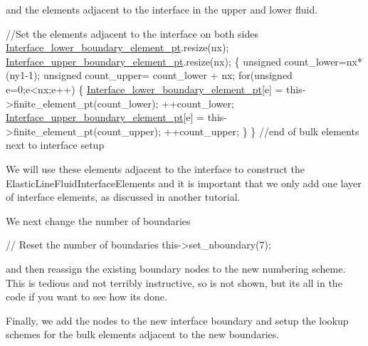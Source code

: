 and the elements adjacent to the interface in the upper and lower fluid.


\begin{DoxyCodeInclude}
   \textcolor{comment}{//Set the elements adjacent to the interface on both sides}
   \hyperlink{classElasticTwoLayerMesh_abc8751d632399afe56df6c32e1001582}{Interface\_lower\_boundary\_element\_pt}.resize(nx);
   \hyperlink{classElasticTwoLayerMesh_af8218bd023535d3dbf4af3cf7bc1c12d}{Interface\_upper\_boundary\_element\_pt}.resize(nx);
   \{
    \textcolor{keywordtype}{unsigned} count\_lower=nx*(ny1-1);
    \textcolor{keywordtype}{unsigned} count\_upper= count\_lower + nx; 
    \textcolor{keywordflow}{for}(\textcolor{keywordtype}{unsigned} e=0;e<nx;e++)
     \{
      \hyperlink{classElasticTwoLayerMesh_abc8751d632399afe56df6c32e1001582}{Interface\_lower\_boundary\_element\_pt}[e] =
     this->finite\_element\_pt(count\_lower); ++count\_lower;
      \hyperlink{classElasticTwoLayerMesh_af8218bd023535d3dbf4af3cf7bc1c12d}{Interface\_upper\_boundary\_element\_pt}[e] = 
       this->finite\_element\_pt(count\_upper); ++count\_upper;
     \}
   \} \textcolor{comment}{//end of bulk elements next to interface setup}

\end{DoxyCodeInclude}


We will use these elements adjacent to the interface to construct the {\ttfamily Elastic\+Line\+Fluid\+Interface\+Elements} and it is important that we only add one layer of interface elements, as discussed in another tutorial.

We next change the number of boundaries


\begin{DoxyCodeInclude}
   \textcolor{comment}{// Reset the number of boundaries}
   this->set\_nboundary(7);

\end{DoxyCodeInclude}


and then reassign the existing boundary nodes to the new numbering scheme. This is tedious and not terribly instructive, so is not shown, but it\textquotesingle{}s all in the code if you want to see how it\textquotesingle{}s done.

Finally, we add the nodes to the new interface boundary and setup the lookup schemes for the bulk elements adjacent to the new boundaries.

